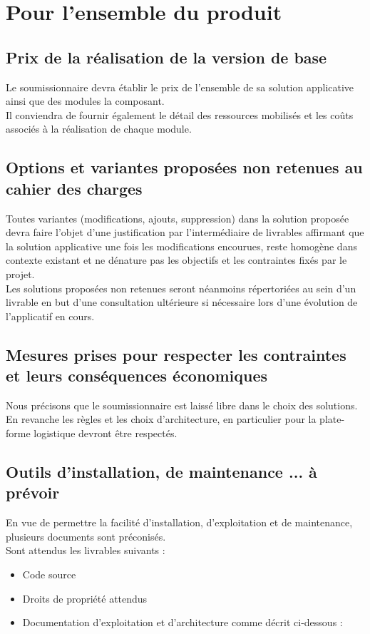 \section{Pour l'ensemble du produit}

\subsection{Prix de la réalisation de la version de base}
Le soumissionnaire devra établir le prix de l'ensemble de sa solution applicative ainsi que des modules la composant.
\\
Il conviendra de fournir également le détail des ressources mobilisés et les coûts associés à la réalisation de chaque module. 

\subsection{Options et variantes proposées non retenues au cahier des charges}
Toutes variantes (modifications, ajouts, suppression) dans la solution proposée devra faire l'objet d'une justification par l'intermédiaire de livrables affirmant que la solution applicative une fois les modifications encourues, reste homogène dans contexte existant et ne dénature pas les objectifs et les contraintes fixés par le projet.
\\
Les solutions proposées non retenues seront néanmoins répertoriées au sein d'un livrable en but d'une consultation ultérieure si nécessaire lors d'une évolution de l'applicatif en cours.

\subsection{Mesures prises pour respecter les contraintes et leurs conséquences économiques}
Nous précisons que le soumissionnaire est laissé libre dans le choix des solutions. En revanche les règles et les choix d'architecture, en particulier pour la plate-forme logistique devront être respectés.

\subsection{Outils d'installation, de maintenance ... à prévoir}
En vue de permettre la facilité d'installation, d'exploitation et de maintenance, plusieurs documents sont préconisés.
\\
Sont attendus les livrables suivants :
\begin{itemize}[label=\textbullet]
 \item Code source
 \item Droits de propriété attendus
 \item Documentation d'exploitation et d'architecture comme décrit ci-dessous :
\end{itemize}

